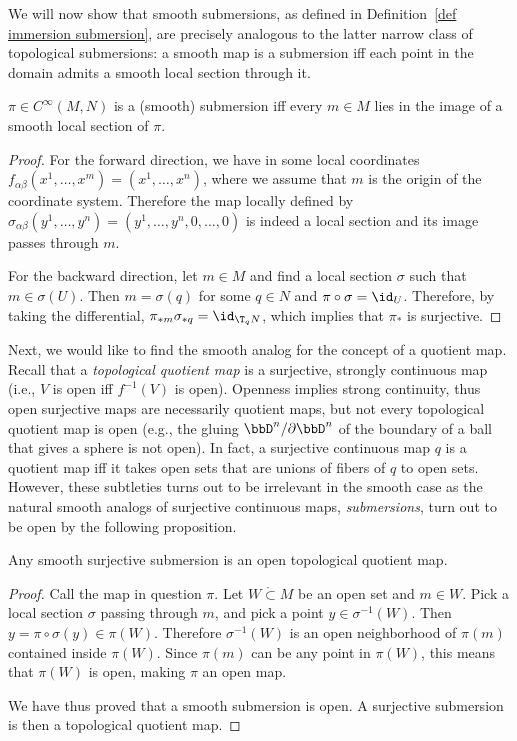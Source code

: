 We will now show that smooth submersions, as defined in Definition~\ref{def immersion submersion}, are precisely analogous to the latter narrow class of topological submersions: a smooth map is a submersion iff each point in the domain admits a smooth local section through it.

\begin{thm}\label{thm: local section}
    $\pi\in C^\infty(M,N)$ is a (smooth) submersion iff every $m\in M$ lies in the image of a smooth local section of $\pi$.
\end{thm}
\begin{proof}
    For the forward direction, we have in some local coordinates $f_{\alpha\beta}(x^1,\ldots,x^m)=(x^1,\ldots,x^n)$, where we assume that $m$ is the origin of the coordinate system. Therefore the map locally defined by $\sigma_{\alpha\beta}(y^1,\ldots,y^n)=(y^1,\ldots,y^n,0,\ldots,0)$ is indeed a local section and its image passes through $m$.
    
    For the backward direction, let $m\in M$ and find a local section $\sigma$ such that $m\in \sigma(U)$. Then $m=\sigma(q)$ for some $q\in N$ and $\pi\circ\sigma=\id_U$. Therefore, by taking the differential, $\pi_{\ast m} \sigma_{\ast q}=\id_{\T_q N}$, which implies that $\pi_\ast$ is surjective.
\end{proof}
    
Next, we would like to find the smooth analog for the concept of a quotient map. Recall that a \emph{topological quotient map} is a surjective, strongly continuous map (i.e., $V$ is open iff $f^{-1}(V)$ is open). Openness implies strong continuity, thus open surjective maps are necessarily quotient maps, but not every topological quotient map is open (e.g., the gluing $\bbD^n\slash \partial \bbD^n$ of the boundary of a ball that gives a sphere is not open). In fact, a surjective continuous map $q$ is a quotient map iff it takes open sets that are unions of fibers of $q$ to open sets. However, these subtleties turns out to be irrelevant in the smooth case as the natural smooth analogs of surjective continuous maps, \emph{submersions}, turn out to be open by the following proposition.

\begin{prop}\label{thm submersions are open quotient maps}
    Any smooth surjective submersion is an open topological quotient map.
\end{prop}
\begin{proof}
    Call the map in question $\pi$. Let $W\mathring{\subset} M$ be an open set and $m\in W$. Pick a local section $\sigma $ passing through $m$, and pick a point $y\in \sigma^{-1}(W)$. Then $y=\pi\circ\sigma(y)\in\pi(W)$. Therefore $\sigma^{-1}(W)$ is an open neighborhood of $\pi(m)$ contained inside $\pi(W)$. Since $\pi(m)$ can be any point in $\pi(W)$, this means that $\pi(W)$ is open, making $\pi$ an open map.

    We have thus proved that a smooth submersion is open. A surjective submersion is then a topological quotient map.
\end{proof}

